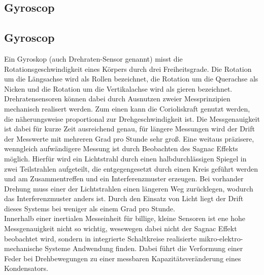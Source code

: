 \subsection{Gyroscop}\subsection{Gyroscop}
Ein Gyroskop (auch Drehraten-Sensor genannt) misst die Rotationsgeschwindigkeit eines Körpers durch drei Freiheitsgrade. Die Rotation um die Längsachse wird als Rollen bezeichnet, die Rotation um die Querachse als Nicken und die Rotation um die Vertikalachse wird als gieren bezeichnet. 
\\
Drehratensensoren können dabei durch Ausnutzen zweier Messprinzipien mechanisch realisert werden. Zum einen kann die Corioliskraft genutzt werden, die näherungsweise proportional zur Drehgeschwindigkeit ist. Die Messgenauigkeit ist dabei für kurze Zeit ausreichend genau, für längere Messungen wird der Drift der Messwerte mit mehreren Grad pro Stunde sehr groß. 
Eine weitaus präzisere, wenngleich aufwändigere Messung ist durch Beobachten des Sagnac Effekts möglich. Hierfür wird ein Lichtstrahl durch einen halbdurchlässigen Spiegel in zwei Teilstrahlen aufgeteilt, die entgegengesetzt durch einen Kreis geführt werden und am Zusammentreffen und ein Interferenzmuster erzeugen. Bei vorhander Drehung muss einer der Lichtstrahlen einen längeren Weg zurücklegen, wodurch das Interferenzmuster anders ist. Durch den Einsatz von Licht liegt der Drift dieses Systems bei weniger als einem Grad pro Stunde. 
\\
Innerhalb einer inertialen Messeinheit für billige, kleine Sensoren ist ene hohe Messgenauigkeit nicht so wichtig, wesewegen dabei nicht der Sagnac Effekt beobachtet wird, sondern in integrierte Schaltkreise realisierte mikro-elektro-mechanische Systeme Andwendung finden. Dabei führt die Verformung einer Feder bei Drehbewegungen zu einer messbaren Kapazitätsveränderung eines Kondensators.
